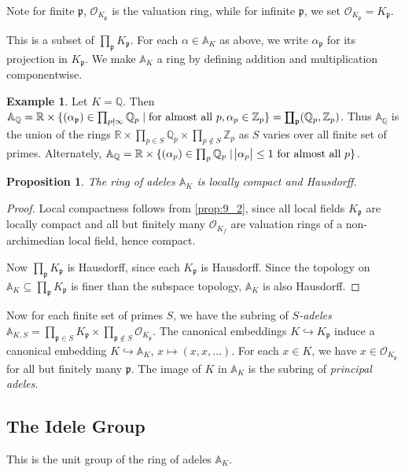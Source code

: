 \documentclass[11pt]{article}
\theoremstyle{definition}
\newtheorem{example}[definition]{Example}
\theoremstyle{plain}
\newtheorem{proposition}[definition]{Proposition}
\theoremstyle{remark}
\newcommand{\bA}{\mathbb{A}}
\newcommand{\ZZ}{\mathbb{Z}}
\newcommand{\QQ}{\mathbb{Q}}
\newcommand{\RR}{\mathbb{R}}
\newcommand{\cO}{\mathcal{O}}
\newcommand{\fp}{\mathfrak{p}}
\newcommand{\rprod}{\mathrlap{\prod}{\coprod}}
\begin{document}
Note for finite $\fp$, $\cO_{K_\fp}$ is the valuation ring, while for infinite $\fp$, we set $\cO_{K_\fp} = K_\fp$.

This is a subset of $\prod_{\fp} K_\fp$. For each $\alpha \in \bA_K$ as above, we write $\alpha_\fp$ for its projection in $K_\fp$. We make $\bA_K$ a ring by defining addition and multiplication componentwise.

\begin{example}\label{eg:9_4}
    Let $K = \QQ$. Then $\bA_\QQ = \RR \times \{(\alpha_\fp) \in \prod_{p \nmid \infty} \QQ_p \mid \text{for almost all } p, \alpha_p \in \ZZ_p\} = \rprod_{\fp} (\QQ_p, \ZZ_p)$. Thus $\bA_\QQ$ is the union of the rings $\RR \times \prod_{p \in S} \QQ_p \times \prod_{p \notin S} \ZZ_p$ as $S$ varies over all finite set of primes. Alternately, $\bA_\QQ = \RR \times \{(\alpha_p) \in \prod_p \QQ_p \mid \abs{\alpha_p} \le 1 \text{ for almost all } p\}$.
\end{example}

\begin{proposition}\label{prop:9_5}
    The ring of adeles $\bA_K$ is locally compact and Hausdorff.
\end{proposition}
\begin{proof}
    Local compactness follows from \autoref{prop:9_2}, since all local fields $K_\fp$ are locally compact and all but finitely many $\cO_{K_f}$ are valuation rings of a non-archimedian local field, hence compact.

    Now $\prod_{\fp} K_\fp$ is Hausdorff, since each $K_\fp$ is Hausdorff. Since the topology on $\bA_K \subseteq \prod_{\fp} K_\fp$ is finer than the subspace topology, $\bA_K$ is also Hausdorff.
\end{proof}

Now for each finite set of primes $S$, we have the subring of \emph{$S$-adeles} $\bA_{K,S} = \prod_{\fp \in S} K_\fp \times \prod_{\fp \notin S} \cO_{K_\fp}$. The canonical embeddings $K \hookrightarrow K_\fp$ induce a canonical embedding $K \hookrightarrow \bA_K$, $x \mapsto (x, x, \ldots)$. For each $x \in K$, we have $x \in \cO_{K_\fp}$ for all but finitely many $\fp$. The image of $K$ in $\bA_K$ is the subring of \emph{principal adeles}.

\subsection{The Idele Group}

This is the unit group of the ring of adeles $\bA_K$.
\end{document}
